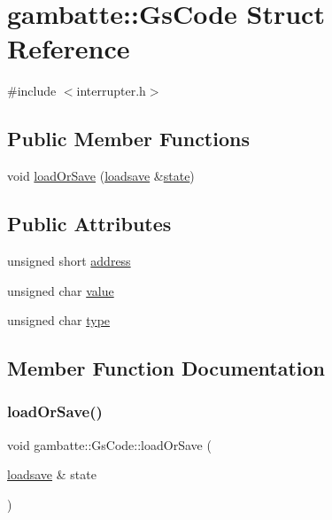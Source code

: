 \hypertarget{structgambatte_1_1GsCode}{}\section{gambatte\+:\+:Gs\+Code Struct Reference}
\label{structgambatte_1_1GsCode}


{\ttfamily \#include $<$interrupter.\+h$>$}

\subsection*{Public Member Functions}
\begin{DoxyCompactItemize}
\item 
void \hyperlink{structgambatte_1_1GsCode_a78a565c0a92af84971fdb3663b91252d}{load\+Or\+Save} (\hyperlink{classgambatte_1_1loadsave}{loadsave} \&\hyperlink{ppu_8cpp_a2f2eca6997ee7baf8901725ae074d45b}{state})
\end{DoxyCompactItemize}
\subsection*{Public Attributes}
\begin{DoxyCompactItemize}
\item 
unsigned short \hyperlink{structgambatte_1_1GsCode_abb512ac03eb8c6c52eff2a381985e473}{address}
\item 
unsigned char \hyperlink{structgambatte_1_1GsCode_abf832b3418728ddd0c32d1db180c508e}{value}
\item 
unsigned char \hyperlink{structgambatte_1_1GsCode_a574a861f9ac283a249062ebc83c3ff15}{type}
\end{DoxyCompactItemize}


\subsection{Member Function Documentation}
\mbox{\label{structgambatte_1_1GsCode_a78a565c0a92af84971fdb3663b91252d}} 
\subsubsection{\texorpdfstring{load\+Or\+Save()}{loadOrSave()}}
{\footnotesize\ttfamily void gambatte\+::\+Gs\+Code\+::load\+Or\+Save (\begin{DoxyParamCaption}\item[{\hyperlink{classgambatte_1_1loadsave}{loadsave} \&}]{state }\end{DoxyParamCaption})\hspace{0.3cm}{\ttfamily [inline]}}



